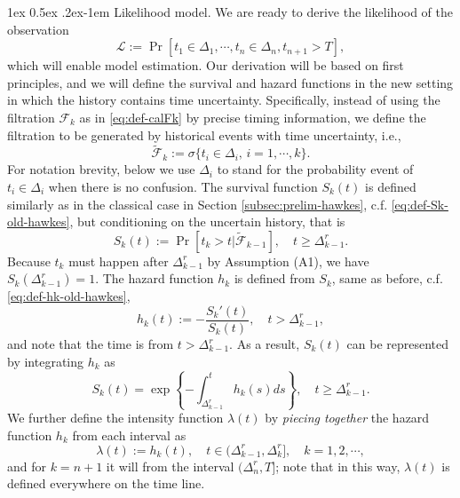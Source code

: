 \documentclass[11pt]{article}
\makeatletter
\theoremstyle{remark}
\theoremstyle{plain}
\newcommand{\calL}{\mathcal{L}}
\newcommand{\calF}{\mathcal{F}}
\renewcommand{\paragraph}{%
  \@startsection{paragraph}{4}%
  {\z@}{1ex \@plus 0.5ex \@minus .2ex}{-1em}%
  {\normalfont\normalsize\itshape}%
}
\makeatother
\begin{document}
\paragraph{Likelihood model.}
We are ready to derive the likelihood of the observation
\begin{equation}\label{eq:def-calL-time-uncert}
\calL := \Pr [  t_1 \in \Delta_1, \cdots, t_n \in\Delta_n, t_{n+1} > T],
\end{equation}
which will enable model estimation.
Our derivation will be based on first principles, and we will define the survival and hazard functions in the new setting in which the history contains time uncertainty. 
Specifically, instead of using the filtration $\calF_k$ as in \eqref{eq:def-calFk} by precise timing information, we define the filtration to be generated by historical events with time uncertainty, i.e.,
\begin{equation}
\tilde{\calF}_k :=  \sigma\{ t_i \in \Delta_i, \, i=1, \cdots, k \}.
\end{equation}
For notation brevity, below we use $\Delta_i$ to stand for the probability event of $t_i \in \Delta_i$ when there is no confusion. 
%
The survival function $S_k(t)$
is defined similarly as in the classical case in Section \ref{subsec:prelim-hawkes},  c.f. \eqref{eq:def-Sk-old-hawkes}, but conditioning on the uncertain history, that is
\begin{equation}\label{eq:def-Sk-time-only}
    S_k(t) := \Pr [ t_k > t | \tilde{\calF}_{k-1}], 
    \quad t \ge \Delta_{k-1}^r. 
\end{equation} 
Because $t_k $ must happen after $\Delta_{k-1}^r$ by Assumption (A1), 
we have $ S_k( \Delta_{k-1}^r ) = 1$.
%
The hazard function $h_k$ is defined from $S_k$, same as before, c.f. \eqref{eq:def-hk-old-hawkes},
\begin{equation}\label{eq:def-hk-time-uncert}
    h_k(t) := -  \frac{S_k'(t)}{S_k(t)},  
    \quad t > \Delta_{k-1}^r, 
\end{equation}
and note that the time is from $t > \Delta_{k-1}^r$.
As a result, $S_k(t)$ can be represented by integrating $h_k$ as 
\begin{equation}\label{eq:Sk-expression-by-hk}
S_k(t) = \exp\left\{ - \int_{\Delta_{k-1}^r}^t h_k(s) ds\right\},  \quad  t \ge \Delta_{k-1}^r.
\end{equation}
We further define the intensity function $\lambda(t)$  by {\it piecing together} the hazard function $h_k$ from each interval as
\begin{equation}\label{eq:def-lambdat-time-only}
\lambda(t) := h_k(t), \quad t \in (\Delta_{k-1}^r, \Delta_{k}^r], \quad k = 1, 2, \cdots, 
\end{equation}
and for $k=n+1$ it will from the interval $(\Delta_n^r, T]$; note that in this way, $\lambda(t)$ is defined everywhere on the time line. 
\end{document}
